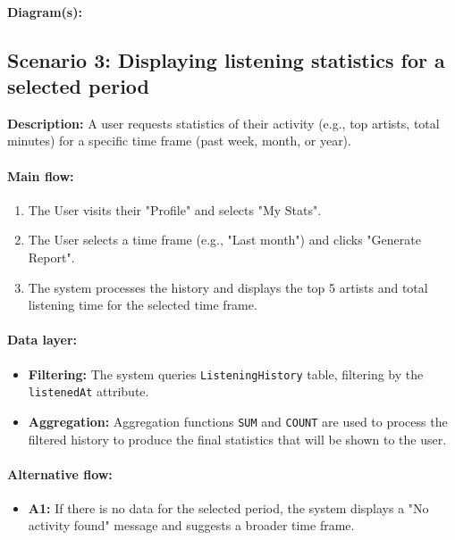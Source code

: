 \documentclass[11pt, a4paper]{article}
\begin{document}
\paragraph{Diagram(s):}

\subsection{Scenario 3: Displaying listening statistics for a selected period}

\textbf{Description:}
A user requests statistics of their activity (e.g., top artists, total minutes) for a specific time frame (past week, month, or year).

\paragraph{Main flow:}
\begin{enumerate}
    \item The User visits their "Profile" and selects "My Stats".
    \item The User selects a time frame (e.g., "Last month") and clicks "Generate Report".
    \item The system processes the history and displays the top 5 artists and total listening time for the selected time frame.
\end{enumerate}

\paragraph{Data layer:}
\begin{itemize}
    \item \textbf{Filtering:} The system queries \texttt{ListeningHistory} table, filtering by the \texttt{listenedAt} attribute.
    \item \textbf{Aggregation:} Aggregation functions \texttt{SUM} and \texttt{COUNT} are used to process the filtered history to produce the final statistics that will be shown to the user.
\end{itemize}

\paragraph{Alternative flow:}
\begin{itemize}
    \item \textbf{A1:} If there is no data for the selected period, the system displays a "No activity found" message and suggests a broader time frame.
\end{itemize}
\end{document}
